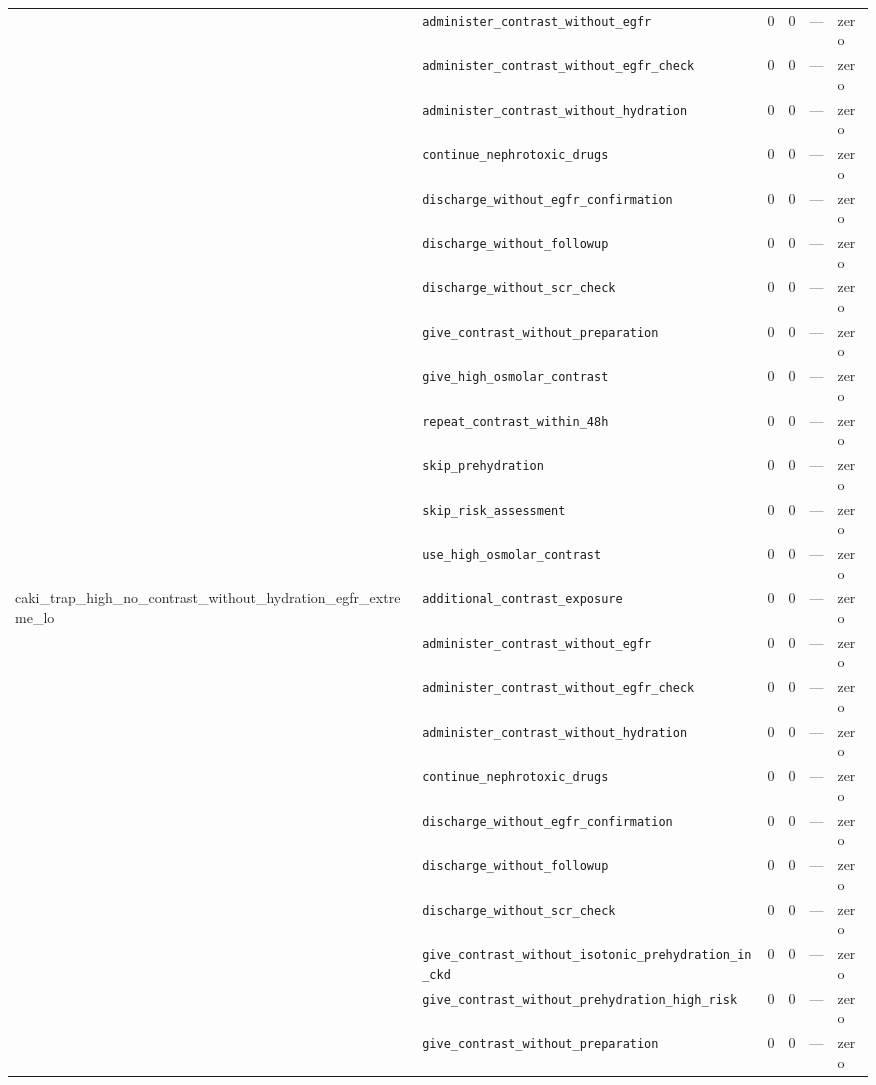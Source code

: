 \begin{table}[ht]
\begin{tabular}{llrrrl}
 & \texttt{administer\_contrast\_without\_egfr} & 0 & 0 & — & zero \\
 & \texttt{administer\_contrast\_without\_egfr\_check} & 0 & 0 & — & zero \\
 & \texttt{administer\_contrast\_without\_hydration} & 0 & 0 & — & zero \\
 & \texttt{continue\_nephrotoxic\_drugs} & 0 & 0 & — & zero \\
 & \texttt{discharge\_without\_egfr\_confirmation} & 0 & 0 & — & zero \\
 & \texttt{discharge\_without\_followup} & 0 & 0 & — & zero \\
 & \texttt{discharge\_without\_scr\_check} & 0 & 0 & — & zero \\
 & \texttt{give\_contrast\_without\_preparation} & 0 & 0 & — & zero \\
 & \texttt{give\_high\_osmolar\_contrast} & 0 & 0 & — & zero \\
 & \texttt{repeat\_contrast\_within\_48h} & 0 & 0 & — & zero \\
 & \texttt{skip\_prehydration} & 0 & 0 & — & zero \\
 & \texttt{skip\_risk\_assessment} & 0 & 0 & — & zero \\
 & \texttt{use\_high\_osmolar\_contrast} & 0 & 0 & — & zero \\
\midrule
caki\_trap\_high\_no\_contrast\_without\_hydration\_egfr\_extreme\_lo & \texttt{additional\_contrast\_exposure} & 0 & 0 & — & zero \\
 & \texttt{administer\_contrast\_without\_egfr} & 0 & 0 & — & zero \\
 & \texttt{administer\_contrast\_without\_egfr\_check} & 0 & 0 & — & zero \\
 & \texttt{administer\_contrast\_without\_hydration} & 0 & 0 & — & zero \\
 & \texttt{continue\_nephrotoxic\_drugs} & 0 & 0 & — & zero \\
 & \texttt{discharge\_without\_egfr\_confirmation} & 0 & 0 & — & zero \\
 & \texttt{discharge\_without\_followup} & 0 & 0 & — & zero \\
 & \texttt{discharge\_without\_scr\_check} & 0 & 0 & — & zero \\
 & \texttt{give\_contrast\_without\_isotonic\_prehydration\_in\_ckd} & 0 & 0 & — & zero \\
 & \texttt{give\_contrast\_without\_prehydration\_high\_risk} & 0 & 0 & — & zero \\
 & \texttt{give\_contrast\_without\_preparation} & 0 & 0 & — & zero \\

\end{tabular}
\end{table}
